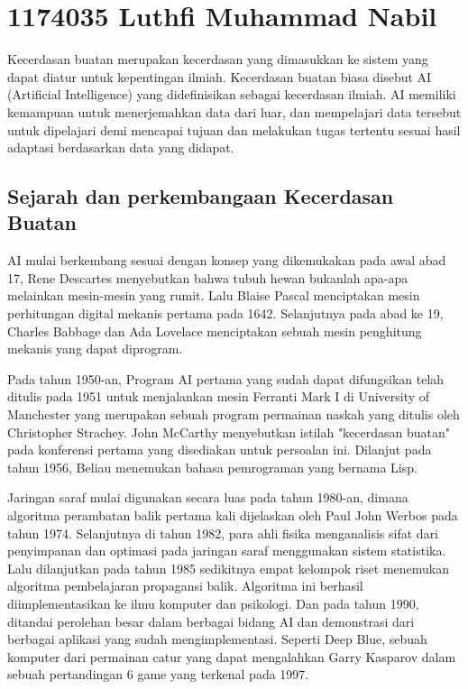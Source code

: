 \section{1174035 Luthfi Muhammad Nabil}
Kecerdasan buatan merupakan kecerdasan yang dimasukkan ke sistem yang dapat diatur untuk kepentingan ilmiah. Kecerdasan buatan biasa disebut AI (Artificial Intelligence) yang didefinisikan sebagai kecerdasan ilmiah. AI memiliki kemampuan untuk menerjemahkan data dari luar, dan mempelajari data tersebut untuk dipelajari demi mencapai tujuan dan melakukan tugas tertentu sesuai hasil adaptasi berdasarkan data yang didapat. 

\subsection{Sejarah dan perkembangaan Kecerdasan Buatan}
AI mulai berkembang sesuai dengan konsep yang dikemukakan pada awal abad 17, Rene Descartes menyebutkan bahwa tubuh hewan bukanlah apa-apa melainkan mesin-mesin yang rumit. Lalu Blaise Pascal menciptakan mesin perhitungan digital mekanis pertama pada 1642. Selanjutnya pada abad ke 19, Charles Babbage dan Ada Lovelace menciptakan sebuah mesin penghitung mekanis yang dapat diprogram.

Pada tahun 1950-an, Program AI pertama yang sudah dapat difungsikan telah ditulis pada 1951 untuk menjalankan mesin Ferranti Mark I di University of Manchester yang merupakan sebuah program permainan naskah yang ditulis oleh Christopher Strachey. John McCarthy menyebutkan istilah "kecerdasan buatan" pada konferensi pertama yang disediakan untuk persoalan ini. Dilanjut pada tahun 1956, Beliau menemukan bahasa pemrograman yang bernama Lisp.

Jaringan saraf mulai digunakan secara luas pada tahun 1980-an, dimana algoritma perambatan balik pertama kali dijelaskan oleh Paul John Werbos pada tahun 1974. Selanjutnya di tahun 1982, para ahli fisika menganalisis sifat dari penyimpanan dan optimasi pada jaringan saraf menggunakan sistem statistika. Lalu dilanjutkan pada tahun 1985 sedikitnya empat kelompok riset menemukan algoritma pembelajaran propagansi balik. Algoritma ini berhasil diimplementasikan ke ilmu komputer dan psikologi. Dan pada tahun 1990, ditandai perolehan besar dalam berbagai bidang AI dan demonstrasi dari berbagai aplikasi yang sudah mengimplementasi. Seperti Deep Blue, sebuah komputer dari permainan catur yang dapat mengalahkan Garry Kasparov dalam sebuah pertandingan 6 game yang terkenal pada 1997. 

